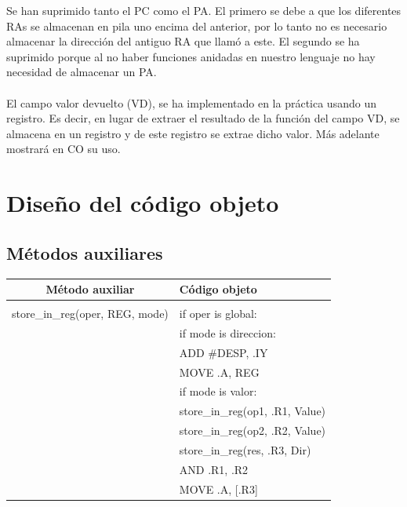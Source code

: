 \documentclass[11pt, , a4paper, titlepage]{article}
\begin{document}
Se han suprimido tanto el PC como el PA. El primero se debe a que los diferentes RAs se almacenan
en pila uno encima del anterior, por lo tanto no es necesario almacenar la dirección del antiguo RA que llamó a este.
El segundo se ha suprimido porque al no haber funciones anidadas en nuestro lenguaje no hay necesidad de almacenar un PA. \\ \\
El campo valor devuelto (VD), se ha implementado en la práctica usando un registro. Es decir, en lugar de extraer el resultado de la función
del campo VD, se almacena en un registro y de este registro se extrae dicho valor. Más adelante mostrará en CO su uso.

\clearpage

\section{Diseño del código objeto}

\subsection{Métodos auxiliares}

\begin{table}[H]
    \centering
    \begin{tabular}{cl}
        \large \textbf{Método auxiliar} & \large \textbf{Código objeto} \\
        \hline  & \\[-2mm]
        store\_in\_reg(oper, REG, mode) 
        & if oper is global:  \\
        & \hspace*{1cm} if mode is direccion: \\
        & \hspace*{1cm} \hspace*{1cm}  ADD \#DESP, .IY \\
        & \hspace*{1cm} \hspace*{1cm}  MOVE .A, REG \\
        & \hspace*{1cm} if mode is valor: \\
        & store\_in\_reg(op1, .R1, Value) \\
        & store\_in\_reg(op2, .R2, Value) \\
        & store\_in\_reg(res, .R3, Dir) \\
        & AND .R1, .R2 \\
        & MOVE .A, [.R3]
        \vspace{2mm} \\
        \hline
    \end{tabular}
\end{table}
\end{document}
